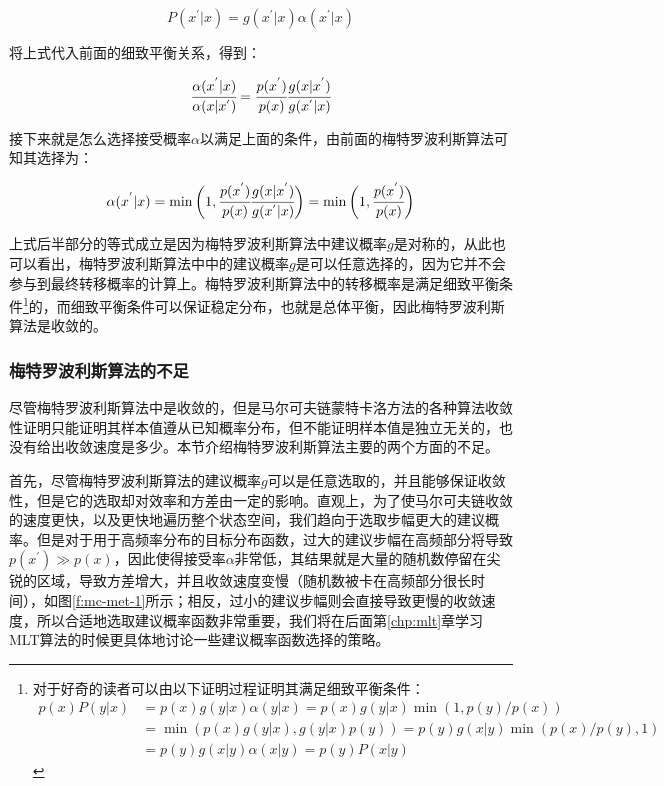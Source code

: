 \begin{equation}
	P(x^{'}|x)=g(x^{'}|x)\alpha(x^{'}|x)
\end{equation}

\noindent 将上式代入前面的细致平衡关系，得到：

\begin{equation}
	 \cfrac{\alpha(x^{'}|x)}{\alpha(x|x^{'})}= \cfrac{p(x^{'})}{p(x)} \cfrac{g(x|x^{'})}{g(x^{'}|x)}
\end{equation}

\noindent 接下来就是怎么选择接受概率$\alpha$以满足上面的条件，由前面的梅特罗波利斯算法可知其选择为：

\begin{equation}
	\alpha(x^{'}|x)=\min \bigg( 1, \cfrac{p(x^{'})}{p(x)} \cfrac{g(x|x^{'})}{g(x^{'}|x)}\bigg)=\min\bigg(1, \cfrac{p(x^{'})}{p(x)}\bigg)
\end{equation}

上式后半部分的等式成立是因为梅特罗波利斯算法中建议概率$g$是对称的，从此也可以看出，梅特罗波利斯算法中中的建议概率$g$是可以任意选择的，因为它并不会参与到最终转移概率的计算上。梅特罗波利斯算法中的转移概率是满足细致平衡条件\footnote{对于好奇的读者可以由以下证明过程证明其满足细致平衡条件：
\begin{equation}
	\begin{aligned}
		p(x)P(y|x)&=p(x)g(y|x)\alpha(y|x)=p(x)g(y|x)\min(1,p(y)/p(x))\\
		&=\min(p(x)g(y|x),g(y|x)p(y))=p(y)g(x|y)\min(p(x)/p(y),1)\\
		&=p(y)g(x|y)\alpha(x|y)=p(y)P(x|y)
	\end{aligned}
\end{equation}
}的，而细致平衡条件可以保证稳定分布，也就是总体平衡，因此梅特罗波利斯算法是收敛的。





\subsubsection{梅特罗波利斯算法的不足}
尽管梅特罗波利斯算法中是收敛的，但是马尔可夫链蒙特卡洛方法的各种算法收敛性证明只能证明其样本值遵从已知概率分布，但不能证明样本值是独立无关的，也没有给出收敛速度是多少。本节介绍梅特罗波利斯算法主要的两个方面的不足。

首先，尽管梅特罗波利斯算法的建议概率$g$可以是任意选取的，并且能够保证收敛性，但是它的选取却对效率和方差由一定的影响。直观上，为了使马尔可夫链收敛的速度更快，以及更快地遍历整个状态空间，我们趋向于选取步幅更大的建议概率。但是对于用于高频率分布的目标分布函数，过大的建议步幅在高频部分将导致$p(x^{'})\gg p(x)$，因此使得接受率$\alpha$非常低，其结果就是大量的随机数停留在尖锐的区域，导致方差增大，并且收敛速度变慢（随机数被卡在高频部分很长时间），如图\ref{f:mc-met-1}所示；相反，过小的建议步幅则会直接导致更慢的收敛速度，所以合适地选取建议概率函数非常重要，我们将在后面第\ref{chp:mlt}章学习MLT算法的时候更具体地讨论一些建议概率函数选择的策略。

